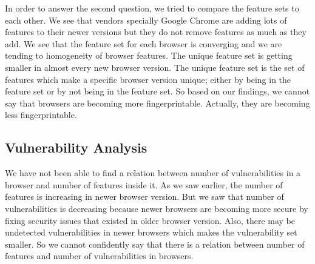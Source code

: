 In order to answer the second question, we tried to compare the feature sets to each other. We see that vendors specially Google Chrome are adding lots of features to their newer versions but they do not remove features as much as they add. We see that the feature set for each browser is converging and we are tending to homogeneity of browser features. The unique feature set is getting smaller in almost every new browser version. The unique feature set is the set of features which make a specific browser version unique; either by being in the feature set or by not being in the feature set. 
So based on our findings, we cannot say that browsers are becoming more fingerprintable. Actually, they are becoming less fingerprintable.




\subsection{Vulnerability Analysis}
We have not been able to find a relation between number of vulnerabilities in a browser and number of features inside it. As we saw earlier, the number of features is increasing in newer browser version. But we saw that number of vulnerabilities is decreasing because newer browsers are becoming more secure by fixing security issues that existed in older browser version. Also, there may be undetected vulnerabilities in newer browsers which makes the vulnerability set smaller. So we cannot confidently say that there is a relation between number of features and number of vulnerabilities in browsers.

